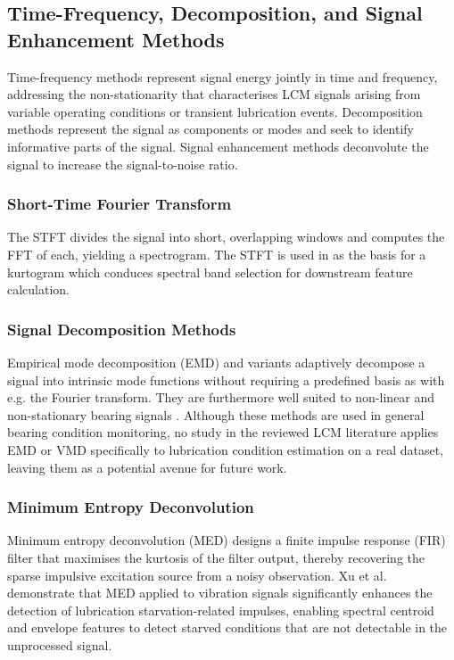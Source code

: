 \subsection{Time-Frequency, Decomposition, and Signal Enhancement Methods}
\label{subsec:sp_tf}

Time-frequency methods represent signal energy jointly in time and frequency, addressing the non-stationarity that characterises LCM signals arising from variable operating conditions or transient lubrication events. Decomposition methods represent the signal as components or modes and seek to identify informative parts of the signal. Signal enhancement methods deconvolute the signal to increase the signal-to-noise ratio.

\subsubsection{Short-Time Fourier Transform}
\label{subsubsec:stft}
The STFT divides the signal into short, overlapping windows and computes the FFT of each, yielding a spectrogram. The STFT is used in \cite{jakobsen_vibration_2021} as the basis for a kurtogram which conduces spectral band selection for downstream feature calculation.

\subsubsection{Signal Decomposition Methods}
\label{subsubsec:decomposition}
Empirical mode decomposition (EMD) and variants adaptively decompose a signal into intrinsic mode functions without requiring a predefined basis as with e.g. the Fourier transform. They are furthermore well suited to non-linear and non-stationary bearing signals \cite{wang_advanced_2024}. Although these methods are used in general bearing condition monitoring, no study in the reviewed LCM literature applies EMD or VMD specifically to lubrication condition estimation on a real dataset, leaving them as a potential avenue for future work.

\subsubsection{Minimum Entropy Deconvolution}
\label{subsubsec:med}
Minimum entropy deconvolution (MED) designs a finite impulse response (FIR) filter that maximises the kurtosis of the filter output, thereby recovering the sparse impulsive excitation source from a noisy observation. Xu et al.\ \cite{xu_vibration-based_2024} demonstrate that MED applied to vibration signals significantly enhances the detection of lubrication starvation-related impulses, enabling spectral centroid and envelope features to detect starved conditions that are not detectable in the unprocessed signal.


